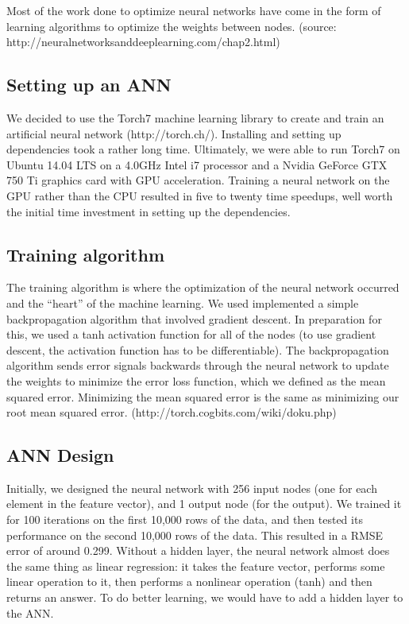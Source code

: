 \documentclass{article}
\begin{document}
Most of the work done to optimize neural networks have come in the form of
 learning algorithms to optimize the weights between nodes.  
 (source: http://neuralnetworksanddeeplearning.com/chap2.html)

\subsection{Setting up an ANN}

We decided to use the Torch7 machine learning library to create and 
train an artificial neural network (http://torch.ch/).  Installing and
 setting up dependencies took a rather long time.  Ultimately, we were
  able to run Torch7 on Ubuntu 14.04 LTS on a 4.0GHz Intel i7 processor
   and a Nvidia GeForce GTX 750 Ti graphics card with GPU acceleration. 
    Training a neural network on the GPU rather than the CPU resulted in
     five to twenty time speedups, well worth the initial time investment
      in setting up the dependencies.


\subsection{Training algorithm}
The training algorithm is where the optimization of the neural network
 occurred and the “heart” of the machine learning.  We used implemented 
 a simple backpropagation algorithm that involved gradient descent.  In 
 preparation for this, we used a tanh activation function for all of the
  nodes (to use gradient descent, the activation function has to be differentiable). 
   The backpropagation algorithm sends error signals backwards through the neural
    network to update the weights to minimize the error loss function, which we
     defined as the mean squared error.  Minimizing the mean squared error is
      the same as minimizing our root mean squared error.
(http://torch.cogbits.com/wiki/doku.php)

\subsection{ANN Design}
Initially, we designed the neural network with 256 input nodes
 (one for each element in the feature vector), and 1 output node
  (for the output).  We trained it for 100 iterations on the first 
  10,000 rows of the data, and then tested its performance on the 
  second 10,000 rows of the data.  This resulted in a RMSE error of
   around 0.299.  Without a hidden layer, the neural network almost
    does the same thing as linear regression: it takes the feature
     vector, performs some linear operation to it, then performs a 
     nonlinear operation (tanh) and then returns an answer.  To do better
      learning, we would have to add a hidden layer to the ANN.
\end{document}
